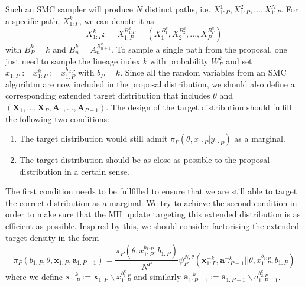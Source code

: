 \documentclass[12pt,a4paper]{article}
\begin{document}
Such an SMC sampler will produce $N$ distinct paths, i.e. $X_{1:P}^1, X_{1:P}^2,...,X_{1:P}^N$. For a specific path, $X_{1:P}^k$, we can denote it as 
$$X_{1:P}^k : = X_{1:P}^{B_{1:P}^k}=\left(X_1^{B_1^k},X_2^{B_2^k},...,X_P^{B_P^k}\right)$$
with $B_P^k = k$ and $B_n^k = A_{n}^{B_{n+1}^k}$. To sample a single path from the proposal, one just need to sample the lineage index $k$ with probability $W_P^k$ and set $x_{1:P}^{'}:= x_{1:P}^{k}:=x_{1:P}^{b_{1:P}}$ with $b_P = k$. Since all the random variables from an SMC algorihtm are now included in the proposal distribution, we should also define a corresponding extended target distribution that includes $\theta$ and $\left(\mathbf{X}_1,...,\mathbf{X}_P,\mathbf{A}_1,...,\mathbf{A}_{P-1}\right)$. The design of the target distribution should fulfill the following two conditions:
\begin{enumerate}[label=\textit{Condition \arabic*.},leftmargin=*]
    \item The target distribution would still admit $\pi_P(\theta,x_{1:P}|y_{1:P})$ as a marginal.
    \item The target distribution should be as close as possible to the proposal distribution in a certain sense.
\end{enumerate}
The first condition needs to be fullfilled to ensure that we are still able to target the correct distribution as a marginal. We try to achieve the second condition in order to make sure that the MH update targeting this extended distribution is as efficient as possible. Inspired by this, we should consider factorising the extended target density in the form
\begin{equation}
    \tilde{\pi}_P(b_{1:P},\theta,\mathbf{x}_{1:P},\mathbf{a}_{1:P-1}) = \frac{\pi_{P}(\theta,x_{1:P}^{b_{1:P}},b_{1:P})}{N^P}\psi_P^{N,\theta}(\mathbf{x}_{1:P}^{-k},\mathbf{a}_{1:P-1}^{-k}||\theta,x_{1:P}^{b_{1:P}},b_{1:P})
\end{equation}  
where we define $\mathbf{x}_{1:P}^{-k} := \mathbf{x}_{1:P}\backslash x_{1:P}^{b_{1:P}^k}$ and similarly $\mathbf{a}_{1:P-1}^{-k} := \mathbf{a}_{1:P-1} \backslash a_{1:P-1}^{b_{2:P}^k}$.
\end{document}
